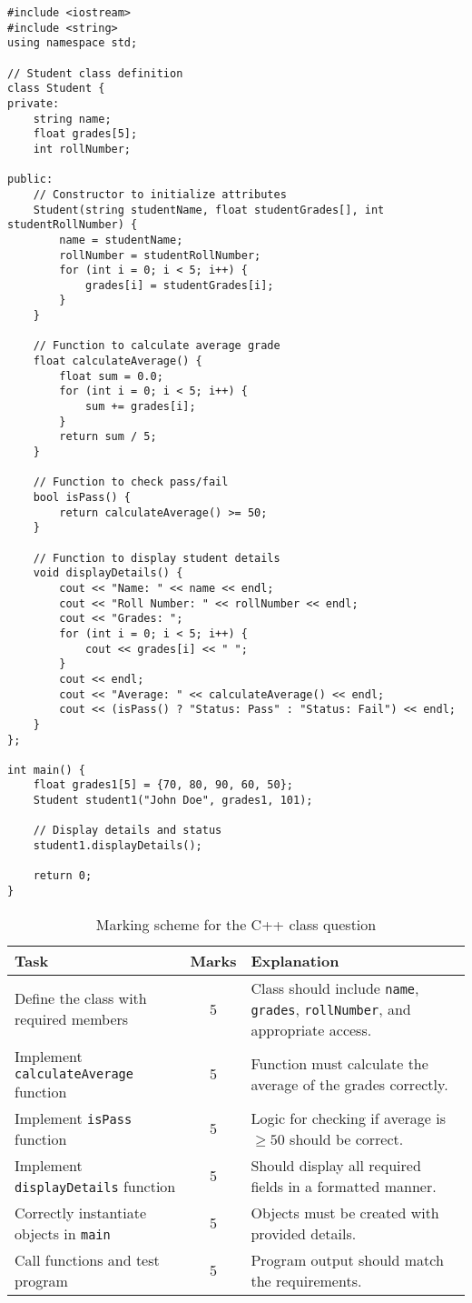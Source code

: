 \documentclass[a4paper,12pt]{article}
\begin{document}
\begin{lstlisting}
#include <iostream>
#include <string>
using namespace std;

// Student class definition
class Student {
private:
    string name;
    float grades[5];
    int rollNumber;

public:
    // Constructor to initialize attributes
    Student(string studentName, float studentGrades[], int studentRollNumber) {
        name = studentName;
        rollNumber = studentRollNumber;
        for (int i = 0; i < 5; i++) {
            grades[i] = studentGrades[i];
        }
    }

    // Function to calculate average grade
    float calculateAverage() {
        float sum = 0.0;
        for (int i = 0; i < 5; i++) {
            sum += grades[i];
        }
        return sum / 5;
    }

    // Function to check pass/fail
    bool isPass() {
        return calculateAverage() >= 50;
    }

    // Function to display student details
    void displayDetails() {
        cout << "Name: " << name << endl;
        cout << "Roll Number: " << rollNumber << endl;
        cout << "Grades: ";
        for (int i = 0; i < 5; i++) {
            cout << grades[i] << " ";
        }
        cout << endl;
        cout << "Average: " << calculateAverage() << endl;
        cout << (isPass() ? "Status: Pass" : "Status: Fail") << endl;
    }
};

int main() {
    float grades1[5] = {70, 80, 90, 60, 50};
    Student student1("John Doe", grades1, 101);

    // Display details and status
    student1.displayDetails();

    return 0;
}

\end{lstlisting}

\begin{table}[H]
\centering
\begin{tabular}{|l|c|p{8cm}|}
\hline
\textbf{Task} & \textbf{Marks} & \textbf{Explanation} \\ \hline
Define the class with required members & 5 & Class should include \texttt{name}, \texttt{grades}, \texttt{rollNumber}, and appropriate access. \\ \hline
Implement \texttt{calculateAverage} function & 5 & Function must calculate the average of the grades correctly. \\ \hline
Implement \texttt{isPass} function & 5 & Logic for checking if average is $\geq 50$ should be correct. \\ \hline
Implement \texttt{displayDetails} function & 5 & Should display all required fields in a formatted manner. \\ \hline
Correctly instantiate objects in \texttt{main} & 5 & Objects must be created with provided details. \\ \hline
Call functions and test program & 5 & Program output should match the requirements. \\ \hline
\end{tabular}
\caption{Marking scheme for the C++ class question}
\label{tab:marking_scheme_cpp}
\end{table}


\vfill
\end{document}
